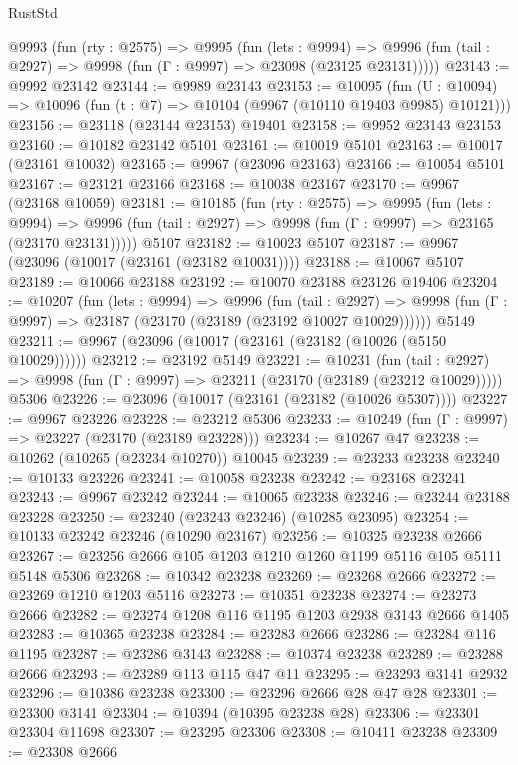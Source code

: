 \begin{lexlean}{RustStd}
\begin{coremodule}
{\begin{coremodule}
{{{{{{{{{{{{{{{{{{{{{{{{{{{{{{{{{{{{{{{{{{{{{{{{{{{{{{{{{{{{{{{{{{{{{{{{{{{{{{  @9993
    (fun (rty : @2575) =>
    @9995
      (fun (lets : @9994) =>
      @9996 (fun (tail : @2927) => @9998 (fun (Γ : @9997) => @23098 (@23125 @23131)))))
@23143 := @9992 @23142
@23144 := @9989 @23143
@23153 := @10095
    (fun (U : @10094) => @10096 (fun (t : @7) => @10104 (@9967 (@10110 @19403 @9985) @10121)))
@23156 := @23118 (@23144 @23153) @19401
@23158 := @9952 @23143 @23153
@23160 := @10182 @23142 @5101
@23161 := @10019 @5101
@23163 := @10017 (@23161 @10032)
@23165 := @9967 (@23096 @23163)
@23166 := @10054 @5101
@23167 := @23121 @23166
@23168 := @10038 @23167
@23170 := @9967 (@23168 @10059)
@23181 := @10185
    (fun (rty : @2575) =>
    @9995
      (fun (lets : @9994) =>
      @9996 (fun (tail : @2927) => @9998 (fun (Γ : @9997) => @23165 (@23170 @23131)))))
    @5107
@23182 := @10023 @5107
@23187 := @9967 (@23096 (@10017 (@23161 (@23182 @10031))))
@23188 := @10067 @5107
@23189 := @10066 @23188
@23192 := @10070 @23188 @23126 @19406
@23204 := @10207
    (fun (lets : @9994) =>
    @9996
      (fun (tail : @2927) =>
      @9998 (fun (Γ : @9997) => @23187 (@23170 (@23189 (@23192 @10027 @10029))))))
    @5149
@23211 := @9967 (@23096 (@10017 (@23161 (@23182 (@10026 (@5150 @10029))))))
@23212 := @23192 @5149
@23221 := @10231
    (fun (tail : @2927) => @9998 (fun (Γ : @9997) => @23211 (@23170 (@23189 (@23212 @10029)))))
    @5306
@23226 := @23096 (@10017 (@23161 (@23182 (@10026 @5307))))
@23227 := @9967 @23226
@23228 := @23212 @5306
@23233 := @10249 (fun (Γ : @9997) => @23227 (@23170 (@23189 @23228)))
@23234 := @10267 @47
@23238 := @10262 (@10265 (@23234 @10270)) @10045
@23239 := @23233 @23238
@23240 := @10133 @23226
@23241 := @10058 @23238
@23242 := @23168 @23241
@23243 := @9967 @23242
@23244 := @10065 @23238
@23246 := @23244 @23188 @23228
@23250 := @23240 (@23243 @23246) (@10285 @23095)
@23254 := @10133 @23242 @23246 (@10290 @23167)
@23256 := @10325 @23238 @2666
@23267 := @23256 @2666 @105 @1203 @1210 @1260 @1199 @5116 @105 @5111 @5148 @5306
@23268 := @10342 @23238
@23269 := @23268 @2666
@23272 := @23269 @1210 @1203 @5116
@23273 := @10351 @23238
@23274 := @23273 @2666
@23282 := @23274 @1208 @116 @1195 @1203 @2938 @3143 @2666 @1405
@23283 := @10365 @23238
@23284 := @23283 @2666
@23286 := @23284 @116 @1195
@23287 := @23286 @3143
@23288 := @10374 @23238
@23289 := @23288 @2666
@23293 := @23289 @113 @115 @47 @11
@23295 := @23293 @3141 @2932
@23296 := @10386 @23238
@23300 := @23296 @2666 @28 @47 @28
@23301 := @23300 @3141
@23304 := @10394 (@10395 @23238 @28)
@23306 := @23301 @23304 @11698
@23307 := @23295 @23306
@23308 := @10411 @23238
@23309 := @23308 @2666
}}}}}}}}}}}}}}}}}}}}}}}}}}}}}}}}}}}}}}}}}}}}}}}}}}}}}}}}}}}}}}}}}}}}}}}}}}}}}}
\end{coremodule}}
\end{coremodule}
\end{lexlean}

